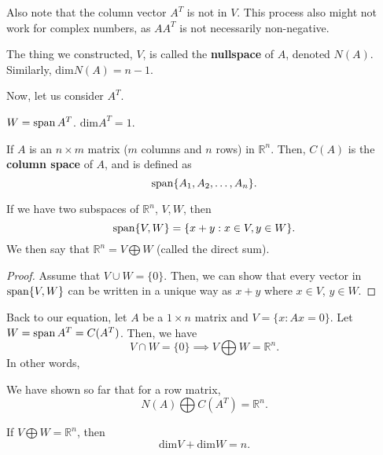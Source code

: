 \begin{note}
	Also note that the column vector \( A^{T}  \) is not in \( V \). This process also might not work for complex numbers, as \( A A^{T}  \) is not necessarily non-negative.
\end{note}

\begin{definition}
	The thing we constructed, \( V \), is called the \textbf{nullspace} of \( A \), denoted \( N(A) \). Similarly, \( \text{dim}N(A) = n-1  \).
\end{definition}

Now, let us consider \( A^{T}  \). 

\begin{definition}
	\( W = \operatorname{span} A^{T}  \). \( \text{dim}A^{T} = 1  \).
\end{definition}

\begin{definition}
	If \( A \) is an \( n\times m \) matrix (\( m \) columns and \( n \) rows) in \( \mathbb{R}^{n}  \). Then, \( C(A) \) is the \textbf{column space} of \( A \), and is defined as \[
		\operatorname{span} \{A_{1},A_{2},\ldots ,A_n\}  
	.\] 
\end{definition}

\begin{prop}
	If we have two subspaces of \( \mathbb{R}^{n}  \), \( V,W \), then \[
		\operatorname{span} \{V, W\} = \{x + y : x \in V, y \in W\}  
	.\] We then say that \( \mathbb{R}^{n} = V \bigoplus W \) (called the direct sum).
\end{prop}
\begin{proof}
	Assume that \( V \cup W = \{0\}   \). Then, we can show that every vector in \( \operatorname{span} \{V, W\}   \) can be written in a unique way as \( x+y \) where \( x \in V \), \( y \in W \).
\end{proof}

Back to our equation, let \( A \) be a \( 1\times n \) matrix and \( V = \{x : Ax=0\}   \). Let \( W = \operatorname{span} A^{T} = C(A^{T} )  \). Then, we have \[
	V \cap W = \{0\} \implies V \bigoplus W = \mathbb{R}^{n} 
.\] In other words,

\begin{prop}
	We have shown so far that for a row matrix,
	\[
		N(A) \bigoplus C(A^{T} ) = \mathbb{R}^{n} 
	.\] 
\end{prop}

\begin{prop}
	If \( V \bigoplus W = \mathbb{R}^{n}  \), then \[
		\text{dim}V + \text{dim}W = n
	.\] 
\end{prop}
